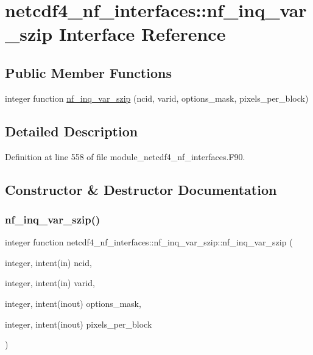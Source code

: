 \hypertarget{interfacenetcdf4__nf__interfaces_1_1nf__inq__var__szip}{}\section{netcdf4\+\_\+nf\+\_\+interfaces\+:\+:nf\+\_\+inq\+\_\+var\+\_\+szip Interface Reference}
\label{interfacenetcdf4__nf__interfaces_1_1nf__inq__var__szip}
\subsection*{Public Member Functions}
\begin{DoxyCompactItemize}
\item 
integer function \hyperlink{interfacenetcdf4__nf__interfaces_1_1nf__inq__var__szip_abe173241499255dd7fd28456bbcacefc}{nf\+\_\+inq\+\_\+var\+\_\+szip} (ncid, varid, options\+\_\+mask, pixels\+\_\+per\+\_\+block)
\end{DoxyCompactItemize}


\subsection{Detailed Description}


Definition at line 558 of file module\+\_\+netcdf4\+\_\+nf\+\_\+interfaces.\+F90.



\subsection{Constructor \& Destructor Documentation}
\mbox{\label{interfacenetcdf4__nf__interfaces_1_1nf__inq__var__szip_abe173241499255dd7fd28456bbcacefc}} 
\subsubsection{\texorpdfstring{nf\+\_\+inq\+\_\+var\+\_\+szip()}{nf\_inq\_var\_szip()}}
{\footnotesize\ttfamily integer function netcdf4\+\_\+nf\+\_\+interfaces\+::nf\+\_\+inq\+\_\+var\+\_\+szip\+::nf\+\_\+inq\+\_\+var\+\_\+szip (\begin{DoxyParamCaption}\item[{integer, intent(in)}]{ncid,  }\item[{integer, intent(in)}]{varid,  }\item[{integer, intent(inout)}]{options\+\_\+mask,  }\item[{integer, intent(inout)}]{pixels\+\_\+per\+\_\+block }\end{DoxyParamCaption})}



